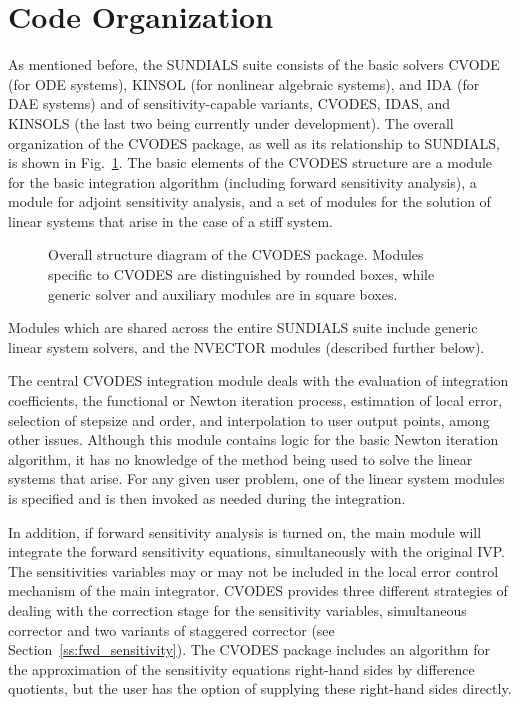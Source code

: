 \section{Code Organization}\label{s:organization}

As mentioned before, the SUNDIALS suite consists of the basic solvers
CVODE (for ODE systems), KINSOL (for nonlinear algebraic
systems), and IDA (for DAE systems) and of sensitivity-capable variants,
CVODES, IDAS, and KINSOLS (the last two being currently under development).
%
The overall organization of the CVODES package, as well as its relationship
to SUNDIALS, is shown in Fig.~\ref{f:cvsorg}.  
The basic elements of the CVODES structure are a module for
the basic integration algorithm (including forward sensitivity analysis),
a module for adjoint sensitivity analysis, and a set of modules for the solution
of linear systems that arise in the case of a stiff system.  
\begin{figure}
\centerline{}
\caption {Overall structure diagram of the CVODES package.
  Modules specific to CVODES are distinguished by rounded boxes, while 
  generic solver and auxiliary modules are in square boxes.}
\label{f:cvsorg}
\end{figure}
Modules which are shared across the entire SUNDIALS suite include
generic linear system solvers, and the NVECTOR modules (described
further below).

The central CVODES integration module deals with the evaluation of
integration coefficients, the functional or Newton iteration process,
estimation of local error, selection of stepsize and order, and
interpolation to user output points, among other issues.  Although
this module contains logic for the basic Newton iteration algorithm,
it has no knowledge of the method being used to solve the linear
systems that arise.  For any given user problem, one of the linear
system modules is specified and is then invoked as needed during the
integration.

In addition, if forward sensitivity analysis is turned on, the main
module will integrate the forward sensitivity equations,
simultaneously with the original IVP.  The sensitivities variables may
or may not be included in the local error control mechanism of the
main integrator.  CVODES provides three different strategies of
dealing with the correction stage for the sensitivity variables,
simultaneous corrector and two variants of staggered corrector (see
Section~\ref{ss:fwd_sensitivity}).  The CVODES package includes an
algorithm for the approximation of the sensitivity equations
right-hand sides by difference quotients, but the user has the option
of supplying these right-hand sides directly.

